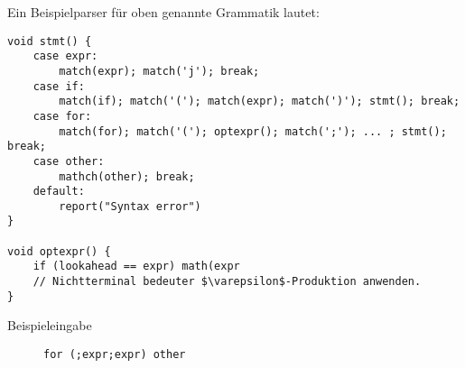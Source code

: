 Ein Beispielparser für oben genannte Grammatik lautet:
\begin{lstlisting}[keywords={void, case, break},emphstyle=\underline,emph={expr,if,for,other}]
void stmt() {
    case expr:
        match(expr); match('j'); break;
    case if:
        match(if); match('('); match(expr); match(')'); stmt(); break;
    case for:
        match(for); match('('); optexpr(); match(';'); ... ; stmt(); break;
    case other:
        mathch(other); break;
    default:
        report("Syntax error")
}

void optexpr() {
    if (lookahead == expr) math(expr
    // Nichtterminal bedeuter $\varepsilon$-Produktion anwenden.
}
\end{lstlisting}
\begin{description}
\item[Beispieleingabe]\lstinline[keywords={void, case, break},emphstyle=\underline,emph={expr,if,for,other}]!for (;expr;expr) other!
\begin{center}
\end{center}

\end{description}








